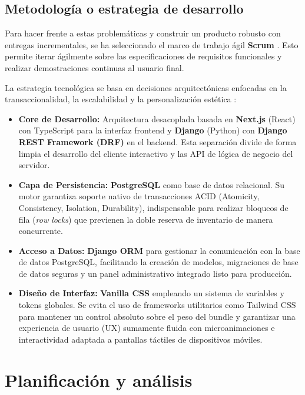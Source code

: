 \documentclass[12pt,spanish,a4paper]{report}
\begin{document}
\section{Metodología o estrategia de desarrollo}
Para hacer frente a estas problemáticas y construir un producto robusto con entregas incrementales, se ha seleccionado el marco de trabajo ágil \textbf{Scrum} \cite{schwaber2002}. Esto permite iterar ágilmente sobre las especificaciones de requisitos funcionales y realizar demostraciones continuas al usuario final.

La estrategia tecnológica se basa en decisiones arquitectónicas enfocadas en la transaccionalidad, la escalabilidad y la personalización estética \cite{pressman2014}:
\begin{itemize}
    \item \textbf{Core de Desarrollo:} Arquitectura desacoplada basada en \textbf{Next.js} (React) con TypeScript para la interfaz frontend y \textbf{Django} (Python) con \textbf{Django REST Framework (DRF)} en el backend. Esta separación divide de forma limpia el desarrollo del cliente interactivo y las API de lógica de negocio del servidor.
    \item \textbf{Capa de Persistencia:} \textbf{PostgreSQL} como base de datos relacional. Su motor garantiza soporte nativo de transacciones ACID (Atomicity, Consistency, Isolation, Durability), indispensable para realizar bloqueos de fila (\textit{row locks}) que previenen la doble reserva de inventario de manera concurrente.
    \item \textbf{Acceso a Datos:} \textbf{Django ORM} para gestionar la comunicación con la base de datos PostgreSQL, facilitando la creación de modelos, migraciones de base de datos seguras y un panel administrativo integrado listo para producción.
    \item \textbf{Diseño de Interfaz:} \textbf{Vanilla CSS} empleando un sistema de variables y tokens globales. Se evita el uso de frameworks utilitarios como Tailwind CSS para mantener un control absoluto sobre el peso del bundle y garantizar una experiencia de usuario (UX) sumamente fluida con microanimaciones e interactividad adaptada a pantallas táctiles de dispositivos móviles.
\end{itemize}

\newpage

\chapter{Planificación y análisis}
\end{document}
